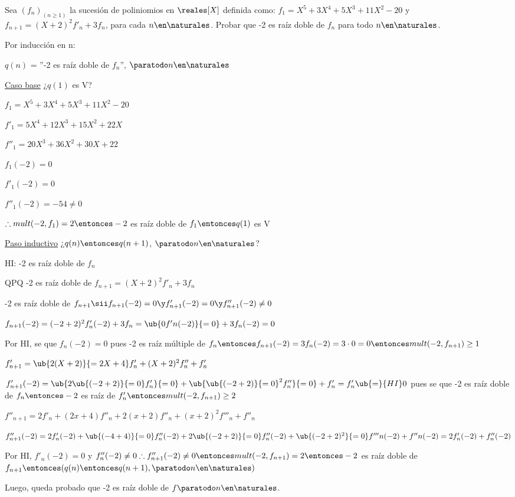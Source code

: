 \ejercicio
Sea $(f_n)_{(n\geq 1)}$ la sucesión de poliniomios en $\reales[X]$ definida como:
$f_1 = X^5 + 3X^4 + 5X^3 + 11X^2 - 20$ y $f_{n+1} = (X + 2)^2 f'_n + 3 f_n$, para cada $n \en \naturales$.
Probar que -2 es raíz doble de $f_n$ para todo $n \en \naturales$.

\separadorCorto

Por inducción en n:

$q(n)$ = ''-2 es raíz doble de $f_n$'', $\paratodo n \en \naturales$

\underline{Caso base} ¿$q(1)$ es V?

$f_1 = X^5 + 3X^4 + 5X^3 + 11X^2 - 20$

$f'_1 = 5X^4 + 12X^3 + 15X^2 + 22X$

$f''_1 = 20X^3 + 36X^2 + 30X + 22$

$f_1(-2) = 0$

$f'_1(-2) = 0$

$f''_1(-2) = -54 \neq 0$

$\therefore mult(-2, f_1) = 2 \entonces -2$ es raíz doble de $f_1 \entonces q(1)$ es V

\underline{Paso inductivo} ¿$q(n) \entonces q(n+1)$, $\paratodo n \en \naturales$?

HI: -2 es raíz doble de $f_n$

QPQ -2 es raíz doble de $f_{n+1} = (X + 2)^2 f'_n + 3f_n$

-2 es raíz doble de $f_{n+1} \sii f_{n+1}(-2) = 0 \y f'_{n+1}(-2) = 0 \y f''_{n+1}(-2) \neq 0$

$f_{n+1}(-2) = (-2+2)^2f'_n(-2)+3f_n = \ub{0f'n(-2)}{=0} + 3 f_n(-2) = 0$

Por HI, se que $f_n(-2) = 0$ pues -2 es raíz múltiple de $f_n \entonces f_{n+1}(-2) = 3f_n(-2) = 3 \cdot 0 = 0 \entonces mult(-2, f_{n+1}) \geq 1$

$f_{n+1}' = \ub{2(X+2)}{=2X+4}f'_n + (X+2)^2 f''_n + f'_n$

$f_{n+1}'(-2) = \ub{2\ub{(-2+2)}{=0}f'_n}{=0} + \ub{\ub{(-2+2)}{=0}^2f''_n}{=0} + f'_n = f'_n \ub{=}{HI} 0$ pues se que -2 es raíz doble de $f_n \entonces -2$ es raíz de $f'_n \entonces mult(-2, f_{n+1}) \geq 2$

$f''_{n+1} = 2f'_n + (2x+4)f''_n + 2(x+2) f''_n + (x+2)^2 f'''_n + f''_n$

$f''_{n+1}(-2) = 2f'_n(-2) + \ub{(-4+4)}{=0}f''_n(-2) + 2\ub{(-2+2)}{=0} f''_n(-2) + \ub{(-2+2)^2}{=0} f'''n(-2) + f''n(-2) = 2f'_n(-2) + f''_n(-2)$

Por HI, $f'_n(-2) = 0$ y $f''_n(-2) \neq 0 \therefore f_{n+1}''(-2) \neq 0 \entonces mult(-2, f_{n+1}) = 2 \entonces -2$ es raíz doble de $f_{n+1} \entonces (q(n) \entonces q(n+1), \paratodo n \en \naturales)$

Luego, queda probado que -2 es raíz doble de $f \paratodo n \en \naturales$.

